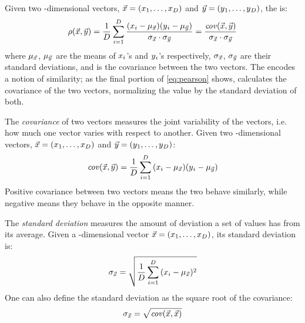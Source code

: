 Given two \numdims{}-dimensional vectors, $\vec{x}{}=(x{}_1,\dots,x{}_{D})$ and $\vec{y}{}=(y{}_1,\dots,y{}_{D})$, the \pearson{}
\pcfunclabel{} is:
\begin{equation}\label{eq:pearson}
    \rho{}(\vec{x{}}, \vec{y{}})
    =
     \frac{1}{D{}}\sum_{i=1}^{D}{}\frac{(x{}_i - \mu_{\vec{x{}}})(y{}_i - \mu_{\vec{y{}}})}{\sigma_{\vec{x{}}}\cdot \sigma_{\vec{y{}}}} 
    =
    \frac{\mathit{cov}(\vec{x{}}, \vec{y{}})}{\sigma_{\vec{x{}}}\cdot\sigma_{\vec{y}}}
\end{equation}
where $\mu_{\vec{x}{}}$, $\mu_{\vec{y}{}}$ are the means of $x{}_i$'s and $y{}_i$'s respectively,
$\sigma_{\vec{x{}}}$, $\sigma_{\vec{y{}}}$ are their standard deviations,
and \veccov{\pca{}}{\pcb{}} is the covariance between the two vectors.
\index{\pearson{}}
\index{\pcfunclabel{}}
\index{\pcshort{}}
The \pearson{} encodes a notion of similarity;
as the final portion of \autoref{eq:pearson} shows, \pcshort{} calculates the covariance of the two vectors, normalizing the value by the standard deviation of both.

The \textit{covariance} of two vectors measures the joint variability of the vectors, i.e. how much one vector varies with respect to another.
Given two \numdims{}-dimensional vectors, $\vec{x}{}=(x{}_1,\dots,x{}_{D})$ and $\vec{y}{}=(y{}_1,\dots,y{}_{D})$:
\begin{equation}
    \mathit{cov}(\vec{x{}}, \vec{y{}}) =  \frac{1}{D{}}\sum_{i=1}^{D}{}(x{}_i - \mu_{\vec{x{}}})(y{}_i - \mu_{\vec{y{}}}) 
\end{equation}
Positive covariance between two vectors means the two behave similarly, while negative means they behave in the opposite manner. 

The \textit{standard deviation} measures the amount of deviation a set of values has from its average.
Given a \numdims{}-dimensional vector $\vec{x}{}=(x{}_1,\dots,x{}_{D})$, its standard deviation is:
\begin{equation}
    \sigma_{\vec{x{}}} =  \sqrt{\frac{1}{D{}}\sum_{i=1}^{D}{}(x{}_i - \mu_{\vec{x{}}})^2}  
\end{equation}
One can also define the standard deviation as the square root of the covariance:
\begin{equation}
    \sigma_{\vec{x{}}} = \sqrt{\mathit{cov}(\vec{x{}}, \vec{x{}})}
\end{equation}

